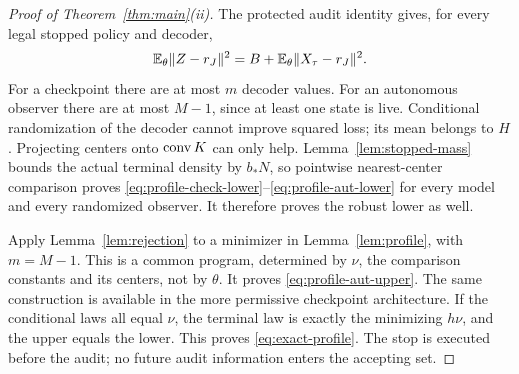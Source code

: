 \begin{proof}[Proof of Theorem~\ref{thm:main}(ii)]
The protected audit identity gives, for every legal stopped policy and decoder,
\begin{equation}\label{eq:protected-pythagoras}
 \mathbb E_\theta\lVert Z-r_J\rVert^2=B+\mathbb E_\theta\lVert X_\tau-r_J\rVert^2.
\end{equation}
For a checkpoint there are at most $m$ decoder values. For an autonomous observer there are at most $M-1$, since at least one state is live. Conditional randomization of the decoder cannot improve squared loss; its mean belongs to $H$. Projecting centers onto $\operatorname{conv} K$ can only help. Lemma~\ref{lem:stopped-mass} bounds the actual terminal density by $b_*N$, so pointwise nearest-center comparison proves \eqref{eq:profile-check-lower}--\eqref{eq:profile-aut-lower} for every model and every randomized observer. It therefore proves the robust lower as well.

Apply Lemma~\ref{lem:rejection} to a minimizer in Lemma~\ref{lem:profile}, with $m=M-1$. This is a common program, determined by $\nu$, the comparison constants and its centers, not by $\theta$. It proves \eqref{eq:profile-aut-upper}. The same construction is available in the more permissive checkpoint architecture. If the conditional laws all equal $\nu$, the terminal law is exactly the minimizing $h\nu$, and the upper equals the lower. This proves \eqref{eq:exact-profile}. The stop is executed before the audit; no future audit information enters the accepting set.
\end{proof}

